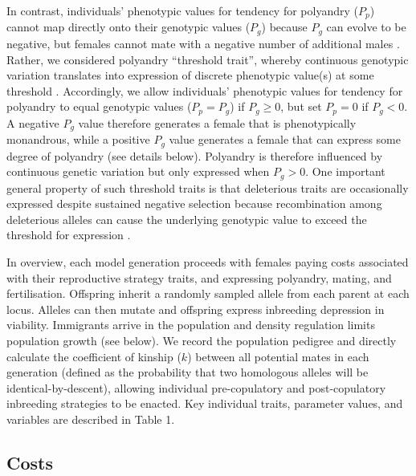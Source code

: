\documentclass[10pt,letterpaper]{article}
\begin{document}
In contrast, individuals' phenotypic values for tendency for polyandry ($P_{p}$) cannot map directly onto their genotypic values ($P_{g}$) because $P_{g}$ can evolve to be negative, but females cannot mate with a negative number of additional males \cite[e.g.,][]{Shuker2007, Evans2013}. Rather, we considered polyandry ``threshold trait'', whereby continuous genotypic variation translates into expression of discrete phenotypic value(s) at some threshold \cite[][]{Lynch1998, Roff1996, Roff1998, Duthie}. Accordingly, we allow individuals' phenotypic values for tendency for polyandry to equal genotypic values ($P_{p} = P_{g}$) if $P_{g} \geq 0$, but set $P_{p} = 0$ if $P_{g} < 0$. A negative $P_{g}$ value therefore generates a female that is phenotypically monandrous, while a positive $P_{g}$ value generates a female that can express some degree of polyandry (see details below). Polyandry is therefore influenced by continuous genetic variation but only expressed when $P_{g} > 0$. One important general property of such threshold traits is that deleterious traits are occasionally expressed despite sustained negative selection because recombination among deleterious alleles can cause the underlying genotypic value to exceed the threshold for expression \cite[][]{Roff1996, Roff1998}.

In overview, each model generation proceeds with females paying costs associated with their reproductive strategy traits, and expressing polyandry, mating, and fertilisation. Offspring inherit a randomly sampled allele from each parent at each locus. Alleles can then mutate and offspring express inbreeding depression in viability. Immigrants arrive in the population and density regulation limits population growth (see below). We record the population pedigree and directly calculate the coefficient of kinship ($k$) between all potential mates in each generation (defined as the probability that two homologous alleles will be identical-by-descent), allowing individual pre-copulatory and post-copulatory inbreeding strategies to be enacted. Key individual traits, parameter values, and variables are described in Table 1.

\subsection*{Costs}
\end{document}
